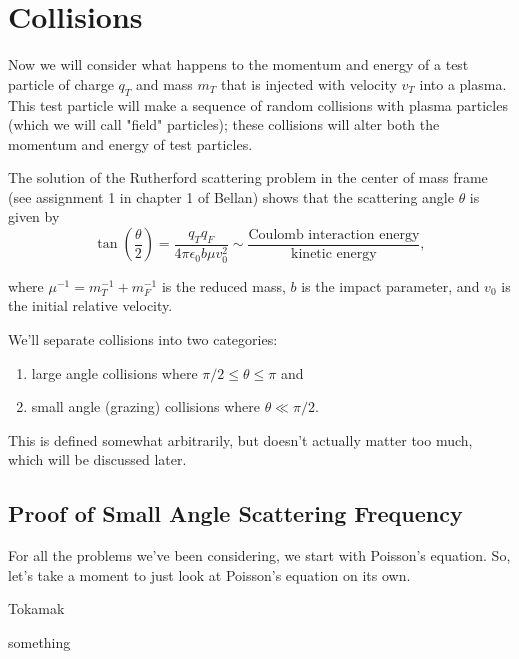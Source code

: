 \section{Collisions}
Now we will consider what happens to the momentum and energy of a test particle of charge $q_T$ and mass $m_T$ that is injected with velocity $v_T$ into a plasma. This test particle will make a sequence of random collisions with plasma particles (which we will call "field" particles); these collisions will alter both the momentum and energy of test particles.

The solution of the Rutherford scattering problem in the center of mass frame (see assignment 1 in chapter 1 of Bellan) shows that the scattering angle $\theta$ is given by
\begin{equation}
  \tan{\left(\frac{\theta}{2}\right)} = \frac{q_Tq_F}{4\pi\epsilon_0b\mu v_0^2} \sim \frac{\text{Coulomb interaction energy}}{\text{kinetic energy}},
\end{equation}

where $\mu^{-1} = m_T^{-1} + m_F^{-1}$ is the reduced mass, $b$ is the impact parameter, and $v_0$ is the initial relative velocity.

We'll separate collisions into two categories:
\begin{enumerate}
  \item large angle collisions where $\pi/2 \leq \theta \leq \pi$ and 
  \item small angle (grazing) collisions where $\theta \ll \pi/2$.
\end{enumerate}

This is defined somewhat arbitrarily, but doesn't actually matter too much, which will be discussed later.


\subsection{Proof of Small Angle Scattering Frequency}
For all the problems we've been considering, we start with Poisson's equation. So, let's take a moment to just look at Poisson's equation on its own.
\begin{eg}
  Tokamak
\end{eg}
\begin{explanation}
  something
\end{explanation}
